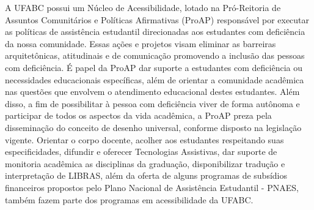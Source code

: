 A UFABC possui um Núcleo de Acessibilidade, lotado na Pró-Reitoria de Assuntos Comunitários e Políticas Afirmativas (ProAP) responsável por executar as políticas de assistência estudantil direcionadas aos estudantes com deficiência da nossa comunidade. Essas ações e projetos visam eliminar as barreiras arquitetônicas, atitudinais e de comunicação promovendo a inclusão das pessoas com deficiência. É papel da ProAP dar suporte a estudantes com deficiência ou necessidades educacionais específicas, além de orientar a comunidade acadêmica nas questões que envolvem o atendimento educacional destes estudantes. Além disso, a fim de possibilitar à pessoa com deficiência viver de forma autônoma e participar de todos os aspectos da vida acadêmica, a ProAP preza pela disseminação do conceito de desenho universal, conforme disposto na legislação vigente. Orientar o corpo docente, acolher aos estudantes respeitando suas especificidades, difundir e oferecer Tecnologias Assistivas, dar suporte de monitoria acadêmica as disciplinas da graduação, disponibilizar tradução e interpretação de LIBRAS, além da oferta de alguns programas de subsídios financeiros propostos pelo Plano Nacional de Assistência Estudantil - PNAES, também fazem parte dos programas em acessibilidade da UFABC. 
